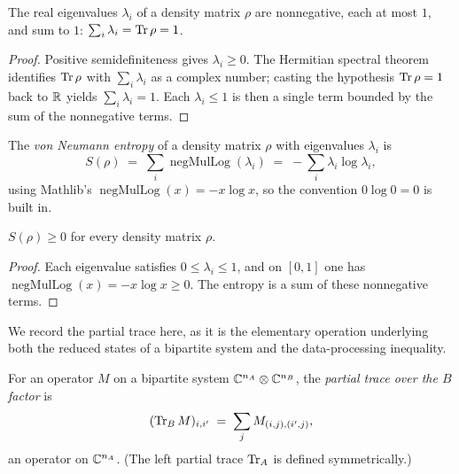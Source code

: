 \begin{lemma}\label{DensityMatrix.sum_eigenvalues_eq_one}
  \leanok
  The real eigenvalues \(\lambda_i\) of a density matrix \(\rho\) are nonnegative, each at most
  \(1\), and sum to \(1\): \(\sum_i \lambda_i = \operatorname{Tr}\rho = 1\).
\end{lemma}
\begin{proof}\leanok
  Positive semidefiniteness gives \(\lambda_i\ge 0\). The Hermitian spectral theorem identifies
  \(\operatorname{Tr}\rho\) with \(\sum_i\lambda_i\) as a complex number; casting the hypothesis \(\operatorname{Tr}\rho = 1\)
  back to \(\mathbb{R}\) yields \(\sum_i\lambda_i = 1\). Each \(\lambda_i\le 1\) is then a single term
  bounded by the sum of the nonnegative terms.
\end{proof}

\begin{definition}\label{vonNeumannEntropy}
  \leanok
  The \emph{von Neumann entropy} of a density matrix \(\rho\) with eigenvalues \(\lambda_i\) is
  \[
    S(\rho) \;=\; \sum_i \operatorname{negMulLog}(\lambda_i) \;=\; -\sum_i \lambda_i\log\lambda_i,
  \]
  using Mathlib's \(\operatorname{negMulLog}(x) = -x\log x\), so the convention \(0\log 0 = 0\) is
  built in.
\end{definition}

\begin{theorem}\label{vonNeumannEntropy_nonneg}
  \leanok
  \(S(\rho)\ge 0\) for every density matrix \(\rho\).
\end{theorem}
\begin{proof}\leanok
  Each eigenvalue satisfies \(0\le\lambda_i\le 1\), and on \([0,1]\) one has
  \(\operatorname{negMulLog}(x) = -x\log x\ge 0\). The entropy is a sum of these nonnegative
  terms.
\end{proof}

We record the partial trace here, as it is the elementary operation underlying both the reduced
states of a bipartite system and the data-processing inequality.

\begin{definition}\label{partialTraceRight}
  \leanok
  For an operator \(M\) on a bipartite system \(\mathbb{C}^{n_A}\otimes\mathbb{C}^{n_B}\), the \emph{partial
  trace over the \(B\) factor} is
  \[
    (\operatorname{Tr}_B M)_{i,i'} \;=\; \sum_j M_{(i,j),(i',j)},
  \]
  an operator on \(\mathbb{C}^{n_A}\). (The left partial trace \(\operatorname{Tr}_A\) is defined symmetrically.)
\end{definition}

